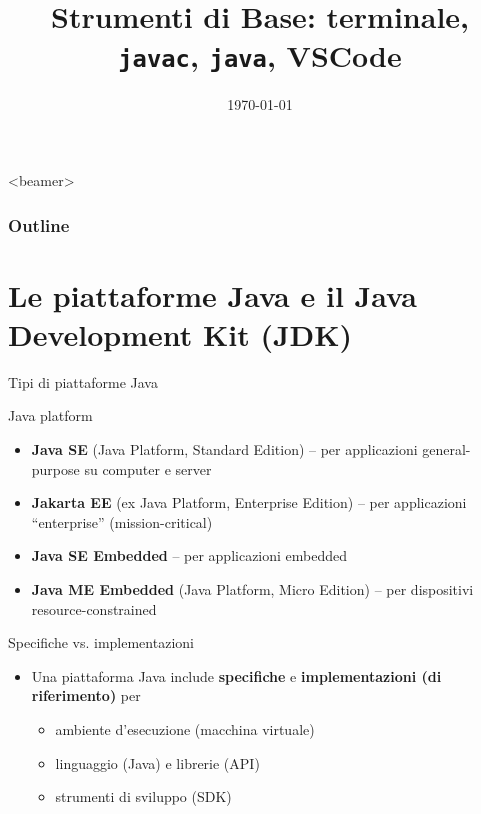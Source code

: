 \documentclass[xcolor=dvipsnames,presentation]{beamer}
\title[Strumenti di Base] %
{Strumenti di Base: terminale, \texttt{javac}, \texttt{java}, VSCode}
\date[\today]{\today}
\begin{document}
\frame[label=coverpage]{\titlepage}

\begin{frame}<beamer>
    \frametitle{Outline}
    \tableofcontents[]
\end{frame}


\section{Le piattaforme Java e il Java Development Kit (JDK)}

\begin{frame}{Tipi di piattaforme Java}

\begin{block}{Java platform}
\begin{itemize}
\item \textbf{Java SE} (Java Platform, Standard Edition) -- per applicazioni general-purpose su computer e server
\item \textbf{Jakarta EE} (ex Java Platform, Enterprise Edition) -- per applicazioni ``enterprise'' (mission-critical)
\item \textbf{Java SE Embedded} -- per applicazioni embedded
\item \textbf{Java ME Embedded} (Java Platform, Micro Edition) -- per dispositivi resource-constrained
\end{itemize}
\end{block}

\begin{block}{Specifiche vs. implementazioni}
\begin{itemize}
\item Una piattaforma Java include \textbf{specifiche} e \textbf{implementazioni (di riferimento)} per
	\begin{itemize}
	\item ambiente d'esecuzione (macchina virtuale)
	\item linguaggio (Java) e librerie (API)
	\item strumenti di sviluppo (SDK)
	\end{itemize}
\end{itemize}
\end{block}

\end{frame}
\end{document}
